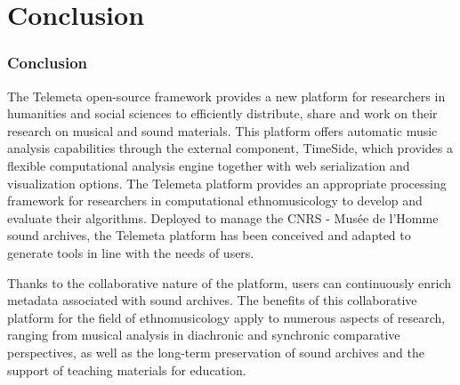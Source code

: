 \documentclass[final, hyperref, table]{beamer}
\begin{document}
\section{Conclusion}
\begin{frame}\frametitle{Conclusion}
  The Telemeta open-source framework provides a new platform for researchers in humanities and social sciences to efficiently distribute, share and work on their research on musical and sound materials. 
This platform offers automatic music analysis capabilities through the external component, TimeSide, which provides a flexible computational analysis engine together with web serialization and visualization options. 
The Telemeta platform provides an appropriate processing framework for researchers in computational ethnomusicology to develop and evaluate their algorithms. 
Deployed to manage the CNRS - Musée de l’Homme sound archives, the Telemeta platform has been conceived and adapted to generate tools in line with the needs of users. 

Thanks to the collaborative nature of the platform, users can continuously enrich metadata associated with sound archives. 
The benefits of this collaborative platform for the field of ethnomusicology apply to numerous aspects of research, ranging from musical analysis in diachronic and synchronic comparative perspectives, as well as the long-term preservation of sound archives and the support of teaching materials for education. 

\end{frame}
\end{document}
